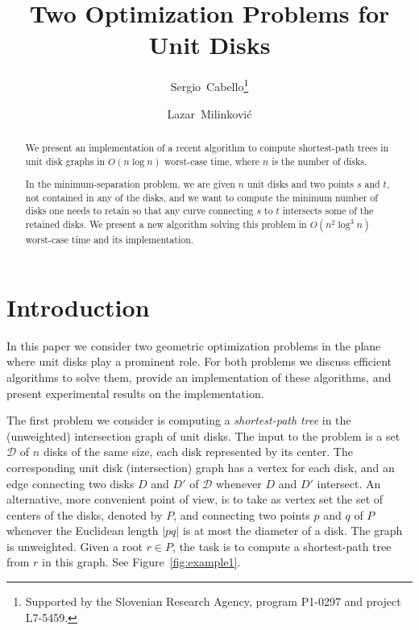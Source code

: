 \documentclass[a4paper,USenglish]{lipics}
\title{Two Optimization Problems for Unit Disks}
\author[1]{Sergio~Cabello\footnote{Supported by the Slovenian Research Agency, program P1-0297 and project L7-5459.}}
\author[2]{Lazar~Milinkovi\'c}
\affil[1]{FMF, University of Ljubljana, and 
	Institute of Mathematics, Physics and Mechanics, Slovenia}
\affil[2]{FMF and FRI, University of Ljubljana, Slovenia}
\newcommand{\D}{\ensuremath{\mathcal{D}}}
\begin{document}
\maketitle

\begin{abstract}
We present an implementation of a recent algorithm to compute shortest-path trees
in unit disk graphs in $O(n\log n)$ worst-case time, 
where $n$ is the number of disks.

In the minimum-separation problem, we are given $n$ unit disks and two points $s$ and $t$,
not contained in any of the disks, and we want to compute 
the minimum number of disks one needs to retain so that any curve connecting
$s$ to $t$ intersects some of the retained disks.
We present a new algorithm solving this problem in $O(n^2\log^3 n)$ worst-case time
and its implementation.
\end{abstract}

\section{Introduction}

In this paper we consider two geometric optimization problems in the plane
where unit disks play a prominent role. For both problems 
we discuss efficient algorithms to solve them, provide an implementation
of these algorithms, and present experimental results on the implementation.

The first problem we consider is computing a \emph{shortest-path tree} 
in the (unweighted) intersection graph of unit disks. 
The input to the problem is a set $\D$ of $n$ disks of the same size, 
each disk represented by its center.
The corresponding unit disk (intersection) graph has a vertex for each disk,
and an edge connecting two disks $D$ and $D'$ of $\D$ whenever $D$ and $D'$ intersect.
An alternative, more convenient point of view, is to take as vertex set the set of
centers of the disks, denoted by $P$, and connecting two points $p$ and $q$ of $P$ 
whenever the Euclidean length $|pq|$ is at most the diameter of a disk. 
The graph is unweighted.
Given a root $r\in P$, the task is to compute a shortest-path tree from $r$ in this graph.
See Figure~\ref{fig:example1}.
\end{document}
